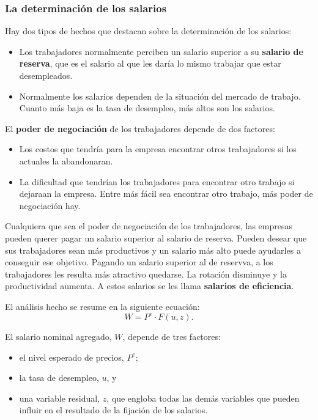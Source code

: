 \documentclass[10pt]{article}
\begin{document}
\begin{multicols*}{2}
\subsubsection{La determinación de los salarios}
Hay dos tipos de hechos que destacan sobre la determinación de los salarios:
\begin{itemize}
    \item Los trabajadores normalmente perciben un salario superior a su \textbf{salario de reserva}, que es el salario al que les daría lo mismo trabajar que estar desempleados.
    \item Normalmente los salarios dependen de la situación del mercado de trabajo. Cuanto más baja es la tasa de desempleo, más altos son los salarios.        
\end{itemize}

El \textbf{poder de negociación} de los trabajadores depende de dos factores:
\begin{itemize}
    \item Los costos que tendría para la empresa encontrar otros trabajadores si los actuales la abandonaran.
    \item La dificultad que tendrían los trabajadores para encontrar otro trabajo si dejaraan la empresa. Entre más fácil sea encontrar otro trabajo, más poder de negociación hay.
\end{itemize}

Cualquiera que sea el poder de negociación de los trabajadores, las empresas pueden querer pagar un salario superior al salario de reserva. Pueden desear que sus trabajadores sean más productivos y un salario más alto puede ayudarles a conseguir ese objetivo. Pagando un salario superior al de reservva, a los trabajadores les resulta más atractivo quedarse. La rotación disminuye y la productividad aumenta. A estos salarios se les llama \textbf{salarios de eficiencia}.

El análisis hecho se resume en la siguiente ecuación:
\[ W = P^e \cdot F(u,z). \]

El salario nominal agregado, $W$, depende de tres factores:
\begin{itemize}
    \item el nivel esperado de precios, $P^e$;
    \item la tasa de desempleo, $u$, y
    \item una variable residual, $z$, que engloba todas las demás variables que pueden influir en el resultado de la fijación de los salarios.
\end{itemize}


\end{multicols*}
\end{document}

